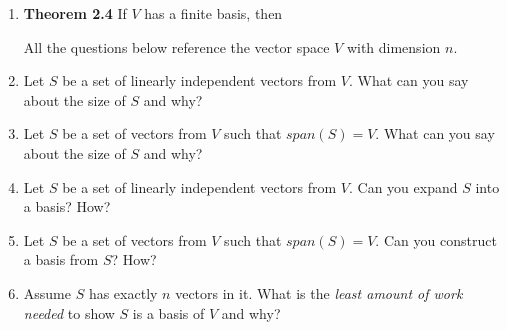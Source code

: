 \documentclass[11pt,fleqn]{article}
\begin{document}
\renewcommand{\headrulewidth}{0pt}
\newcommand{\blank}[1]{\rule{#1}{0.75pt}}
\renewcommand{\d}{\displaystyle}

\vspace*{-0.7in}

\begin{center}
  \large {}
\end{center}
\begin{enumerate}
\item \textbf{Theorem 2.4} If $V$ has a finite basis, then 

\vfill

All the questions below reference the vector space $V$ with dimension $n.$
\vspace{0.3in}

\item Let $S$ be a set of linearly independent vectors from $V$. What can you say about the size of $S$ and why?
\vfill
\item Let $S$ be a set of vectors from $V$ such that $span(S)=V.$ What can you say about the size of $S$ and why?
\vfill
\item Let $S$ be a set of linearly independent vectors from $V$. Can you expand $S$ into a basis? How?
\vfill
\item Let $S$ be a set of vectors from $V$ such that $span(S)=V.$ Can you construct a basis from $S$? How?
\vfill
\item Assume $S$ has exactly $n$ vectors in it. What is the \emph{least amount of work needed} to show $S$ is a basis of $V$ and why?
\vfill
 \end{enumerate}
\end{document}
